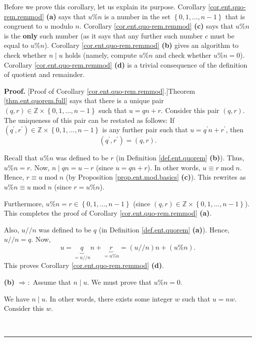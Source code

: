 \documentclass[numbers=enddot,12pt,final,onecolumn,notitlepage]{scrartcl}%
\numberwithin{exer}{subsection}
\theoremstyle{definition}
\newenvironment{proof}[1][Proof]{\noindent\textbf{#1.} }{\ \rule{0.5em}{0.5em}}
\begin{document}
Before we prove this corollary, let us explain its purpose. Corollary
\ref{cor.ent.quo-rem.remmod} \textbf{(a)} says that $u\%n$ is a number in the
set $\left\{  0,1,\ldots,n-1\right\}  $ that is congruent to $u$ modulo $n$.
Corollary \ref{cor.ent.quo-rem.remmod} \textbf{(c)} says that $u\%n$ is the
\textbf{only} such number (as it says that any further such number $c$ must be
equal to $u\%n$). Corollary \ref{cor.ent.quo-rem.remmod} \textbf{(b)} gives an
algorithm to check whether $n\mid u$ holds (namely, compute $u\%n$ and check
whether $u\%n=0$). Corollary \ref{cor.ent.quo-rem.remmod} \textbf{(d)} is a
trivial consequence of the definition of quotient and remainder.

\begin{proof}
[Proof of Corollary \ref{cor.ent.quo-rem.remmod}.]Theorem
\ref{thm.ent.quorem.full} says that there is a unique pair $\left(
q,r\right)  \in\mathbb{Z}\times\left\{  0,1,\ldots,n-1\right\}  $ such that
$u=qn+r$. Consider this pair $\left(  q,r\right)  $. The uniqueness of this
pair can be restated as follows: If $\left(  q^{\prime},r^{\prime}\right)
\in\mathbb{Z}\times\left\{  0,1,\ldots,n-1\right\}  $ is any further pair such
that $u=q^{\prime}n+r^{\prime}$, then%
\begin{equation}
\left(  q^{\prime},r^{\prime}\right)  =\left(  q,r\right)  .
\label{pf.cor.ent.quo-rem.remmod.uni}%
\end{equation}


Recall that $u\%n$ was defined to be $r$ (in Definition \ref{def.ent.quorem}
\textbf{(b)}). Thus, $u\%n=r$. Now, $n\mid qn=u-r$ (since $u=qn+r$). In other
words, $u\equiv r\operatorname{mod}n$. Hence, $r\equiv u\operatorname{mod}n$
(by Proposition \ref{prop.ent.mod.basics} \textbf{(c)}). This rewrites as
$u\%n\equiv u\operatorname{mod}n$ (since $r=u\%n$).

Furthermore, $u\%n=r\in\left\{  0,1,\ldots,n-1\right\}  $ (since $\left(
q,r\right)  \in\mathbb{Z}\times\left\{  0,1,\ldots,n-1\right\}  $). This
completes the proof of Corollary \ref{cor.ent.quo-rem.remmod} \textbf{(a)}.

Also, $u//n$ was defined to be $q$ (in Definition \ref{def.ent.quorem}
\textbf{(a)}). Hence, $u//n=q$. Now,%
\[
u=\underbrace{q}_{=u//n}n+\underbrace{r}_{=u\%n}=\left(  u//n\right)
n+\left(  u\%n\right)  .
\]
This proves Corollary \ref{cor.ent.quo-rem.remmod} \textbf{(d)}.

\textbf{(b)} $\Longrightarrow:$ Assume that $n\mid u$. We must prove that
$u\%n=0$.

We have $n\mid u$. In other words, there exists some integer $w$ such that
$u=nw$. Consider this $w$.


\end{proof}
\end{document}
